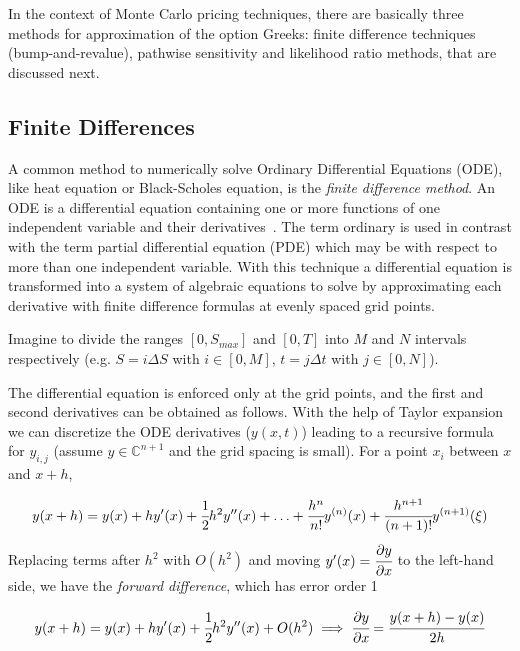 In the context of Monte Carlo pricing techniques, there are basically three methods for approximation of the option Greeks: finite difference techniques (bump-and-revalue), pathwise sensitivity and likelihood ratio methods, that are discussed next.

\subsection{Finite Differences} 
\label{sec:finite_difference}
A common method to numerically solve Ordinary Differential Equations (ODE), like heat equation or Black-Scholes equation, is the \emph{finite difference method}. An ODE is a differential equation containing one or more functions of one independent variable and their derivatives~\cite{bib:ode}. The term ordinary is used in contrast with the term partial differential equation (PDE) which may be with respect to more than one independent variable.
With this technique a differential equation is transformed into a system of algebraic equations to solve by approximating each derivative with finite difference formulas at evenly spaced grid points.

Imagine to divide the ranges $[0, S_{max}]$ and $[0, T]$ into $M$ and $N$ intervals respectively (e.g. $S = i\Delta S$ with $i\in[0, M]$, $t = j\Delta t$ with $j \in[0,N]$).

The differential equation is enforced only at the grid points, and the first and second derivatives can be obtained as follows.
With the help of Taylor expansion we can discretize the ODE  derivatives ($y(x, t)$) leading to a recursive formula for $y_{i,j}$ (assume $y\in\mathbb{C}^{n+1}$ and the grid spacing is small). For a point $x_i$ between $x$ and $x+h$,

\begin{equation}
	y(x+h)=y(x)+hy'(x)+\cfrac{1}{2}h^2y''(x)+\ldots+\cfrac{h^n}{n!}y^{(n)}(x)+\cfrac{h^{n+1}}{(n+1)!}y^{(n+1)}(\xi)
\end{equation}
Replacing terms after $h^2$ with $O(h^2)$ and moving $y'(x)=\cfrac{\partial y}{\partial x}$ to the left-hand side, we have the \emph{forward difference}, which has error order 1

\begin{equation}
	y(x+h)=y(x)+hy'(x)+\cfrac{1}{2}h^2y''(x)+O(h^2)
	\implies \cfrac{\partial y}{\partial x} = \cfrac{y(x+h)-y(x)}{2h}
\end{equation}

